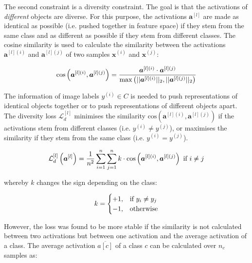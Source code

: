 The second constraint is a diversity constraint. The goal is that the activations of \emph{different} objects are diverse. For this purpose, the activations $\boldsymbol{a}^{[l]}$ are made as identical as possible (i.e. pushed together in feature space) if they stem from the same class and as different as possible if they stem from different classes.
The cosine similarity is used to calculate the similarity between the activations $\boldsymbol{a}^{[l](i)}$ and $\boldsymbol{a}^{[l](j)}$ of two samples $\boldsymbol{x}^{(i)}$ and $\boldsymbol{x}^{(j)}$:

\begin{align}\eqlbl{vso_5}
		\text{cos}\left( \boldsymbol{a}^{[l](i)}, \boldsymbol{a}^{[l](j)} \right) = \frac{\boldsymbol{a}^{[l](i)} \cdot \boldsymbol{a}^{[l](j)}}{\max \left( ||\boldsymbol{a}^{[l](i)}||_2, ||\boldsymbol{a}^{[l](j)}||_2 \right)}
\end{align}

The information of image labels $y^{(i)} \in C$ is needed to push representations of identical objects together or to push representations of different objects apart.
The diversity loss $\mathcal{L}^{[l]}_d$ minimises the similarity $\text{cos} \left(\boldsymbol{a}^{[l](i)}, \boldsymbol{a}^{[l](j)} \right)$ if the activations stem from different classes (i.e. $y^{(i)} \neq y^{(j)}$), or maximises the similarity if they stem from the same class (i.e. $y^{(i)} = y^{(j)}$).

\begin{align}\eqlbl{vso_6}
		\mathcal{L}^{[l]}_{d} \left(\boldsymbol{a}^{[l]} \right) = \frac{1}{n^2} \sum_{i=1}^{n} \sum_{j=1}^{n} k \cdot \text{cos} \left( \boldsymbol{a}^{[l](i)}, \boldsymbol{a}^{[l](j)} \right) \text{ if } i \neq j
\end{align}

whereby $k$ changes the sign depending on the class:

\begin{align}\eqlbl{vso_7}
		k = \begin{cases}
      		+1, & \text{if}\ y_i \neq y_j \\
      		-1, & \text{otherwise}
    	\end{cases}
\end{align}

However, the loss was found to be more stable if the similarity is not calculated between two activations but between one activation and the average activation of a class. The average activation $\overline{a[c]}$ of a class $c$ can be calculated over $n_c$ samples as:

